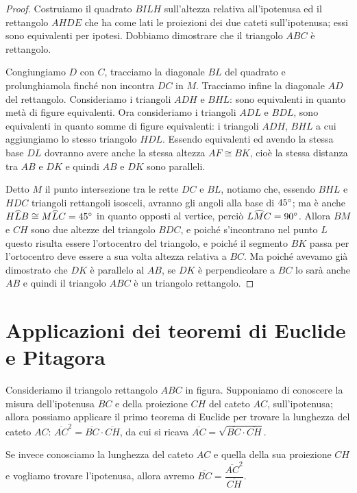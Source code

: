 \begin{proof}
Costruiamo il quadrato $BILH$ sull'altezza relativa all'ipotenusa ed il rettangolo $AHDE$ che ha come lati le proiezioni dei due cateti sull'ipotenusa; essi sono equivalenti per ipotesi. Dobbiamo dimostrare che il triangolo $ABC$ è rettangolo.

Congiungiamo $D$ con $C$, tracciamo la diagonale $BL$ del quadrato e prolunghiamola finché non incontra $DC$ in $M$. Tracciamo infine la diagonale $AD$ del rettangolo. Consideriamo i triangoli $ADH$ e $BHL$: sono equivalenti in quanto metà di figure equivalenti. Ora consideriamo i triangoli $ADL$ e $BDL$, sono equivalenti in quanto somme di figure equivalenti: i triangoli $ADH$, $BHL$ a cui aggiungiamo lo stesso triangolo $HDL$. Essendo equivalenti ed avendo la stessa base $DL$ dovranno avere anche la stessa altezza $AF\cong BK$, cioè la stessa distanza tra $AB$ e $DK$ e quindi $AB$ e $DK$ sono paralleli.

Detto $M$ il punto intersezione tra le rette $DC$ e $BL$, notiamo che, essendo $BHL$ e $HDC$ triangoli rettangoli isosceli, avranno gli angoli alla base di $45{}^{\circ}$; ma è anche $H\widehat{L}B\cong M\widehat{L}C=45{}^{\circ}$ in quanto opposti al vertice, perciò $L\widehat{M}C=90{}^{\circ}$. Allora $BM$ e $CH$ sono due altezze del triangolo $BDC$, e poiché s'incontrano nel punto $L$ questo risulta essere l'ortocentro del triangolo, e poiché il segmento $BK$ passa per l'ortocentro deve essere a sua volta altezza relativa a $BC$. Ma poiché avevamo già dimostrato che $DK$ è parallelo al $AB$, se $DK$ è perpendicolare a $BC$ lo sarà anche $AB$ e quindi il triangolo $ABC$ è un triangolo rettangolo.
\end{proof}

\section{Applicazioni dei teoremi di Euclide e Pitagora}

Consideriamo il triangolo rettangolo $ABC$ in figura.
Supponiamo di conoscere la misura dell'ipotenusa $BC$ e della proiezione $CH$ del cateto $AC$, sull'ipotenusa; allora possiamo applicare il primo teorema di Euclide per trovare la lunghezza del cateto $AC$: $\overline{AC}^2=\overline{BC}\cdot \overline{CH}$, da cui si ricava $\overline{AC}=\sqrt{\overline{BC}\cdot \overline{CH}}$.

Se invece conosciamo la lunghezza del cateto $AC$ e quella della sua proiezione $CH$ e vogliamo trovare l'ipotenusa, allora avremo $\overline{BC}=\dfrac{\overline{AC}^2}{\overline{CH}}$.

